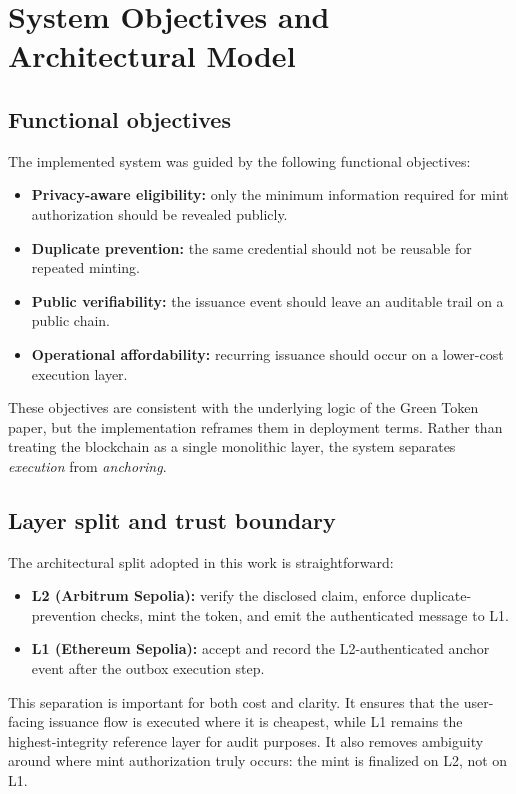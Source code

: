 \documentclass[11pt]{article}
\begin{document}
\section{System Objectives and Architectural Model}

\subsection{Functional objectives}
The implemented system was guided by the following functional objectives:

\begin{itemize}
  \item \textbf{Privacy-aware eligibility:} only the minimum information required for mint authorization should be revealed publicly.
  \item \textbf{Duplicate prevention:} the same credential should not be reusable for repeated minting.
  \item \textbf{Public verifiability:} the issuance event should leave an auditable trail on a public chain.
  \item \textbf{Operational affordability:} recurring issuance should occur on a lower-cost execution layer.
\end{itemize}

These objectives are consistent with the underlying logic of the Green Token paper, but the implementation reframes them in deployment terms. Rather than treating the blockchain as a single monolithic layer, the system separates \emph{execution} from \emph{anchoring}.

\subsection{Layer split and trust boundary}
The architectural split adopted in this work is straightforward:

\begin{itemize}
  \item \textbf{L2 (Arbitrum Sepolia):} verify the disclosed claim, enforce duplicate-prevention checks, mint the token, and emit the authenticated message to L1.
  \item \textbf{L1 (Ethereum Sepolia):} accept and record the L2-authenticated anchor event after the outbox execution step.
\end{itemize}

This separation is important for both cost and clarity. It ensures that the user-facing issuance flow is executed where it is cheapest, while L1 remains the highest-integrity reference layer for audit purposes. It also removes ambiguity around where mint authorization truly occurs: the mint is finalized on L2, not on L1.
\end{document}
